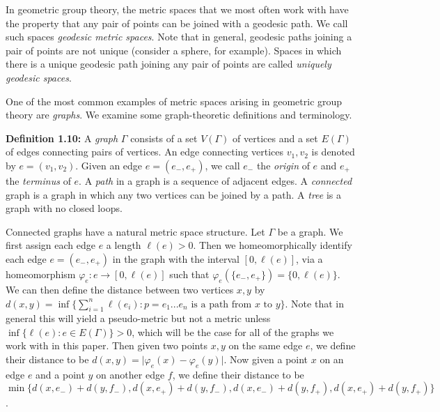 \documentclass[12pt]{article}
\newcommand{\vs}{\vskip10pt}
\begin{document}
	\vs 
	
	In geometric group theory, the metric spaces that we most often work with have the property that any pair of points can be joined with a geodesic path. We call such spaces \textit{geodesic metric spaces}. Note that in general, geodesic paths joining a pair of points are not unique (consider a sphere, for example). Spaces in which there is a unique geodesic path joining any pair of points are called \textit{uniquely geodesic spaces}. 
	
	\vs 
	
	One of the most common examples of metric spaces arising in geometric group theory are \textit{graphs}. We examine some graph-theoretic definitions and terminology.
	
	\vs 
	
	\textbf{Definition 1.10: } A \textit{graph} $\Gamma$ consists of a set $V(\Gamma)$ of vertices and a set $E(\Gamma)$ of edges connecting pairs of vertices. An edge connecting vertices $v_1, v_2$ is denoted by $e = (v_1, v_2)$. Given an edge $e = (e_{-}, e_{+})$, we call $e_{-}$ the \textit{origin} of $e$ and $e_{+}$ the \textit{terminus} of $e$. A \textit{path} in a graph is a sequence of adjacent edges. A \textit{connected} graph is a graph in which any two vertices can be joined by a path. A \textit{tree} is a graph with no closed loops. 
	
	\vs
	
	Connected graphs have a natural metric space structure. Let $\Gamma$ be a graph. We first assign each edge $e$ a length $\ell(e) > 0$. Then we homeomorphically identify each edge $e = (e_{-}, e_{+})$ in the graph with the interval $[0,\ell(e)]$, via a homeomorphism $\varphi_e: e \rightarrow [0,\ell(e)]$ such that $\varphi_e (\{e_{-}, e_{+}\}) = \{0,\ell(e)\}$. We can then define the distance between two vertices $x,y$ by $d(x,y) = \inf \{\sum_{i=1}^n \ell(e_i): p = e_1...e_n \text{ is a path from } x \text{ to } y\}$. Note that in general this will yield a pseudo-metric but not a metric unless $\inf \{\ell(e) : e \in E(\Gamma)\}> 0$, which will be the case for all of the graphs we work with in this paper. Then given two points $x,y$ on the same edge $e$, we define their distance to be $d(x,y) = \vert \varphi_e(x) - \varphi_e(y) \vert$. Now given a point $x$ on an edge $e$ and a point $y$ on another edge $f$, we define their distance to be $\min \{d(x,e_{-}) + d(y, f_{-}), d(x,e_{+}) + d(y, f_{-}), d(x,e_{-}) + d(y, f_{+}), d(x,e_{+}) + d(y, f_{+})\}$. 
	
	
\end{document}
